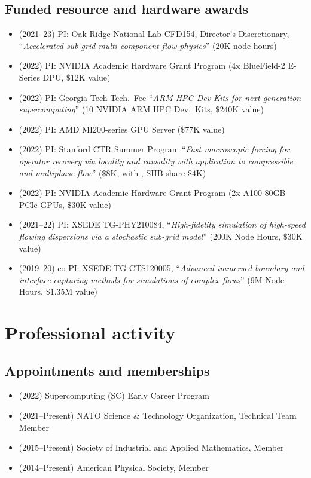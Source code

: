 \subsection{Funded resource and hardware awards}

\begin{itemize}
    \item (2021--23) PI: Oak Ridge National Lab CFD154, Director's Discretionary, ``\textit{Accelerated sub-grid multi-component flow physics}'' (20K node hours)
    \item (2022) PI: NVIDIA Academic Hardware Grant Program (4x BlueField-2 E-Series DPU, $\$12$K value)
    \item (2022) PI: Georgia Tech Tech.\ Fee ``\textit{ARM HPC Dev Kits for next-generation supercomputing}'' (10 NVIDIA ARM HPC Dev.\ Kits, $\$240$K value)
    \item (2022) PI: AMD MI200-series GPU Server ($\$77$K value)
    \item (2022) PI: Stanford CTR Summer Program ``\textit{Fast macroscopic forcing for operator recovery via locality and causality with application to compressible and multiphase flow}'' ($\$8$K, with \Florian, SHB share $\$4$K)
    \item (2022) PI: NVIDIA Academic Hardware Grant Program (2x A100 80GB PCIe GPUs, $\$30$K value)
    \item (2021--22) PI: XSEDE TG-PHY210084, ``\textit{High-fidelity simulation of high-speed flowing dispersions via a stochastic sub-grid model}''  (200K Node Hours, $\$30$K value)
    \item (2019--20) co-PI: XSEDE TG-CTS120005, ``\textit{Advanced immersed boundary and interface-capturing methods for simulations of complex flows}'' (9M Node Hours, $\$1.35$M value)
\end{itemize}

% 

\section{Professional activity}

\subsection{Appointments and memberships}

\begin{itemize}
    \item (2022) Supercomputing (SC) Early Career Program
    \item (2021--Present) NATO Science \& Technology Organization, Technical Team Member
    \item (2015--Present) Society of Industrial and Applied Mathematics, Member
    \item (2014--Present) American Physical Society, Member
\end{itemize}

